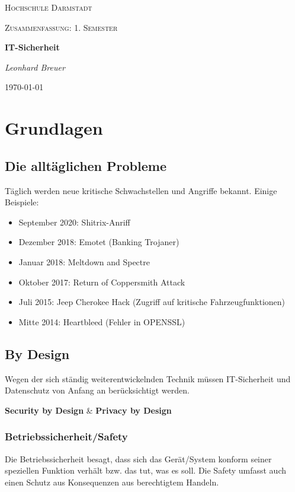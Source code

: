 \documentclass{report}
\begin{document}
\begin{titlepage}
    \centering
	{\LARGE \textsc{Hochschule Darmstadt}\par}
	\vspace{1cm}
	{\Large \textsc{Zusammenfassung: 1. Semester}\par}
	\vspace{1.5cm}
	{\huge\bfseries IT-Sicherheit\par}
	\vspace{2cm}
	{\Large\itshape Leonhard Breuer\par}

	{\large \today\par}
\end{titlepage}
\tableofcontents
\chapter{Grundlagen}
\section{Die alltäglichen Probleme}
Täglich werden neue kritische Schwachstellen und Angriffe bekannt. Einige Beispiele:
\begin{itemize}
    \item September 2020: Shitrix-Anriff
    \item Dezember 2018: Emotet (Banking Trojaner)
    \item Januar 2018: Meltdown and Spectre 
    \item Oktober 2017: Return of Coppersmith Attack 
    \item Juli 2015: Jeep Cherokee Hack (Zugriff auf kritische Fahrzeugfunktionen)
    \item Mitte 2014: Heartbleed (Fehler in OPENSSL)
\end{itemize}
\section{By Design}
Wegen der sich ständig weiterentwickelnden Technik müssen IT-Sicherheit und Datenschutz von Anfang an berücksichtigt werden. \\
\begin{center}
\textbf{Security by Design} \& \textbf{Privacy by Design}
\end{center}
\subsection{Betriebssicherheit/Safety}
Die Betriebssicherheit besagt, dass sich das Gerät/System konform seiner speziellen Funktion verhält bzw. das tut, was es soll.
Die Safety umfasst auch einen Schutz aus Konsequenzen aus berechtigtem Handeln.
\end{document}
